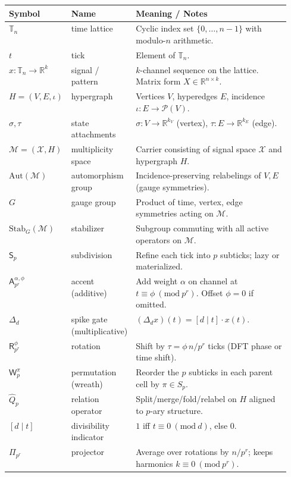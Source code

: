 \documentclass[12pt]{article}
\numberwithin{equation}{section}
\theoremstyle{plain}
\theoremstyle{definition}
\theoremstyle{remark}
\begin{document}
\begin{longtable}{@{}llp{0.55\linewidth}@{}}
\textbf{Symbol} & \textbf{Name} & \textbf{Meaning / Notes} \\
\midrule
$\mathbb{T}_n$ & time lattice & Cyclic index set $\{0,\dots,n-1\}$ with modulo-$n$ arithmetic. \\
$t$ & tick & Element of $\mathbb{T}_n$. \\
$x:\mathbb{T}_n\!\to\!\mathbb{R}^k$ & signal / pattern & $k$-channel sequence on the lattice. Matrix form $X\in\mathbb{R}^{n\times k}$. \\
$H=(V,E,\iota)$ & hypergraph & Vertices $V$, hyperedges $E$, incidence $\iota:E\to\mathcal{P}(V)$. \\
$\sigma,\tau$ & state attachments & $\sigma:V\to\mathbb{R}^{k_V}$ (vertex), $\tau:E\to\mathbb{R}^{k_E}$ (edge). \\
$\mathcal{M}=(\mathcal{X},H)$ & multiplicity space & Carrier consisting of signal space $\mathcal{X}$ and hypergraph $H$. \\
$\mathrm{Aut}(\mathcal{M})$ & automorphism group & Incidence-preserving relabelings of $V,E$ (gauge symmetries). \\
$G$ & gauge group & Product of time, vertex, edge symmetries acting on $\mathcal{M}$. \\
$\mathrm{Stab}_G(\mathcal{M})$ & stabilizer & Subgroup commuting with all active operators on $\mathcal{M}$. \\
$\mathsf{S}_p$ & subdivision & Refine each tick into $p$ subticks; lazy or materialized. \\
$\mathsf{A}_{p^r}^{\alpha,\phi}$ & accent (additive) & Add weight $\alpha$ on channel at $t\equiv\phi\ (\mathrm{mod}\ p^r)$. Offset $\phi=0$ if omitted. \\
$\Delta_{d}$ & spike gate (multiplicative) & $(\Delta_{d}x)(t)=[d\mid t]\cdot x(t)$. \\
$\mathsf{R}_{p^r}^{\phi}$ & rotation & Shift by $\tau=\phi\,n/p^r$ ticks (DFT phase or time shift). \\
$\mathsf{W}_p^{\pi}$ & permutation (wreath) & Reorder the $p$ subticks in each parent cell by $\pi\in S_p$. \\
$\hat{Q}_p$ & relation operator & Split/merge/fold/relabel on $H$ aligned to $p$-ary structure. \\
$[d\mid t]$ & divisibility indicator & $1$ iff $t\equiv 0\ (\mathrm{mod}\ d)$, else $0$. \\
$\Pi_{p^r}$ & projector & Average over rotations by $n/p^r$; keeps harmonics $k\equiv 0 \ (\mathrm{mod}\ p^r)$. \\

\end{longtable}
\end{document}

